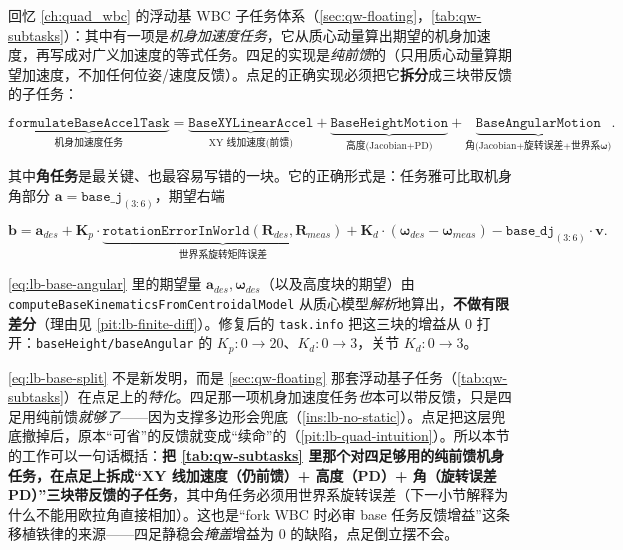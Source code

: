 回忆 \cref{ch:quad_wbc} 的浮动基 WBC 子任务体系（\cref{sec:qw-floating}，\cref{tab:qw-subtasks}）：其中有一项是\emph{机身加速度任务}，它从质心动量算出期望的机身加速度，再写成对广义加速度的等式任务。四足的实现是\emph{纯前馈}的（只用质心动量算期望加速度，不加任何位姿/速度反馈）。点足的正确实现必须把它\textbf{拆分}成三块带反馈的子任务：

\begin{equation}
  \underbrace{\texttt{formulateBaseAccelTask}}_{\text{机身加速度任务}}
  =\underbrace{\texttt{BaseXYLinearAccel}}_{\text{XY 线加速度(前馈)}}
  +\underbrace{\texttt{BaseHeightMotion}}_{\text{高度(Jacobian+PD)}}
  +\underbrace{\texttt{BaseAngularMotion}}_{\text{角(Jacobian+旋转误差+世界系}\boldsymbol\omega)}.
  \label{eq:lb-base-split}
\end{equation}

其中\textbf{角任务}是最关键、也最容易写错的一块。它的正确形式是：任务雅可比取机身角部分 $\mathbf{a}=\texttt{base\_j}_{(3:6)}$，期望右端

\begin{equation}
  \mathbf{b}=\mathbf{a}_{des}
  +\mathbf{K}_p\cdot\underbrace{\texttt{rotationErrorInWorld}(\mathbf{R}_{des},\mathbf{R}_{meas})}_{\text{世界系旋转矩阵误差}}
  +\mathbf{K}_d\cdot(\boldsymbol\omega_{des}-\boldsymbol\omega_{meas})
  -\texttt{base\_dj}_{(3:6)}\cdot\mathbf{v}.
  \label{eq:lb-base-angular}
\end{equation}

\cref{eq:lb-base-angular} 里的期望量 $\mathbf{a}_{des},\boldsymbol\omega_{des}$（以及高度块的期望）由 \texttt{computeBaseKinematicsFromCentroidalModel} 从质心模型\emph{解析}地算出，\textbf{不做有限差分}（理由见 \cref{pit:lb-finite-diff}）。修复后的 \texttt{task.info} 把这三块的增益从 $0$ 打开：\texttt{baseHeight/\allowbreak baseAngular} 的 $K_p:0\to20$、$K_d:0\to3$，关节 $K_d:0\to3$。

\begin{insight}[拆分 base 任务 = 浮动基子任务在“点足无静稳”下的特化]\label{ins:lb-split-is-specialization}
\cref{eq:lb-base-split} 不是新发明，而是 \cref{sec:qw-floating} 那套浮动基子任务（\cref{tab:qw-subtasks}）在点足上的\emph{特化}。四足那一项机身加速度任务\emph{也}本可以带反馈，只是四足用纯前馈\emph{就够了}——因为支撑多边形会兜底（\cref{ins:lb-no-static}）。点足把这层兜底撤掉后，原本“可省”的反馈就变成“续命”的（\cref{pit:lb-quad-intuition}）。所以本节的工作可以一句话概括：\textbf{把 \cref{tab:qw-subtasks} 里那个对四足够用的纯前馈机身任务，在点足上拆成“XY 线加速度（仍前馈）+ 高度（PD）+ 角（旋转误差 PD）”三块带反馈的子任务}，其中角任务必须用世界系旋转误差（下一小节解释为什么不能用欧拉角直接相加）。这也是“fork WBC 时必审 base 任务反馈增益”这条移植铁律的来源——四足静稳会\emph{掩盖}增益为 $0$ 的缺陷，点足倒立摆不会。
\end{insight}

